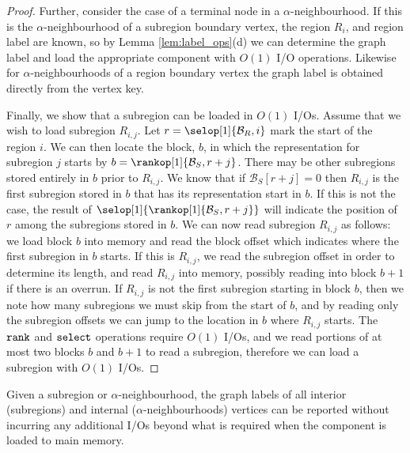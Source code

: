 {\begin{proof}
  Further, consider the case of a terminal node in a
  $\alpha$-neighbourhood. If this is the $\alpha$-neighbourhood of a
  subregion boundary vertex, the region $R_i$, and region label are
  known, so by Lemma \ref{lem:label_ops}(d) we can determine the graph
  label and load the appropriate component with $O(1)$ I/O
  operations. 
  Likewise for $\alpha$-neighbourhoods of a region
  boundary vertex the graph label is obtained directly from the vertex
  key.

  Finally, we show that a subregion can be loaded in $O(1)$
  I/Os. 
  Assume that  we wish to load subregion $R_{i,j}$. 
  Let $r = \selop[1]{\mathcal{B}_R,i}$ mark the start of the region $i$. 
  We can then locate the block, $b$, in which the representation for
  subregion $j$ starts by $b=\rankop[1]{\mathcal{B}_S, r+j}$. 
  There may be other subregions stored entirely in $b$ prior to
  $R_{i,j}$. 
  We know that if $\mathcal{B}_S[r+j] = 0$ then $R_{i,j}$ is the
  first subregion stored in $b$ that has its representation start in
  $b$.  
  If this is not the case, the result of
  $\selop[1]{\rankop[1]{\mathcal{B}_S,r+j}}$ will indicate the position
  of $r$ among the subregions stored in $b$.  
  We can now read
  subregion $R_{i,j}$ as follows: 
  we load block $b$ into memory and
  read the block offset which indicates where the first subregion in
  $b$ starts. 
  If this is $R_{i,j}$, we read the subregion offset in order to
  determine its length, and read $R_{i,j}$ into memory, possibly
  reading into block $b+1$ if there is an overrun. 
  If $R_{i,j}$ is not
  the first subregion starting in block $b$, then we note how many
  subregions we must skip from the start of $b$, and by reading only
  the subregion offsets we can jump to the location in $b$ where
  $R_{i,j}$ starts. 
  The $\texttt{rank}$ and $\texttt{select}$ operations require
  $O(1)$ I/Os, and we read portions of at most two blocks $b$ and
  $b+1$ to read a subregion, therefore we can load a subregion with $O(1)$
  I/Os.
\end{proof}


\begin{lemma}
  \label{lem:report_int_labels}
  Given a subregion or $\alpha$-neighbourhood, the graph labels of
  all interior (subregions) and internal ($\alpha$-neighbourhoods)
  vertices can be reported without incurring any additional I/Os
  beyond what is required when the component is loaded to main memory.
\end{lemma}

}
